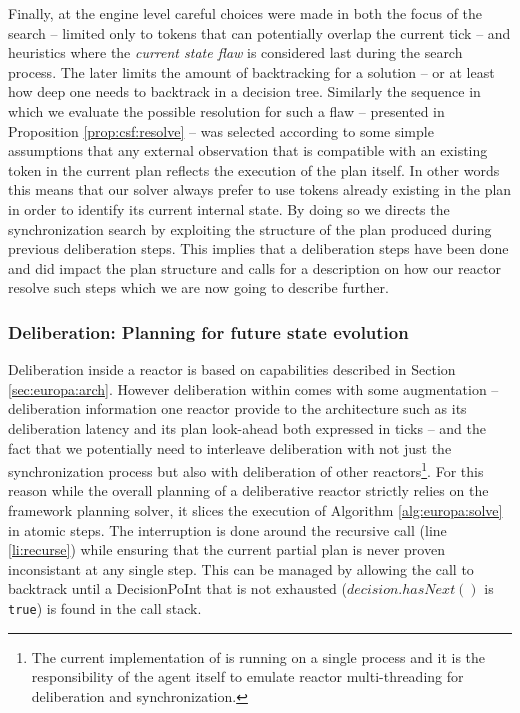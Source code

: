 Finally, at the engine level careful choices were made in 
both the focus of the search -- limited only to tokens that 
can potentially overlap the current tick -- and heuristics where 
the {\em current state flaw} is considered last during the search
process. The later limits the amount of backtracking for a solution 
-- or at least how deep one needs to backtrack in a decision tree. 
Similarly the sequence in which we evaluate the possible resolution 
for such a flaw -- presented in Proposition \ref{prop:csf:resolve} -- 
was selected according to  some simple assumptions that any external 
observation that is compatible with an existing token in the current
plan reflects the execution of the plan itself. In other words this
means that our solver always prefer to use tokens already existing in
the plan in order to identify its current internal state. By doing so
we directs the synchronization search by exploiting the structure of
the plan produced during previous deliberation steps. This implies
that a deliberation steps have been done and did impact the plan
structure and calls for a description on how our \eu reactor resolve
such steps which we are now going to describe further.

\subsubsection{Deliberation: Planning for future state evolution}
\label{sec:arch:plan}

Deliberation inside a reactor is based on \eu capabilities described
in Section \ref{sec:europa:arch}. However deliberation within \rx
comes with some augmentation -- deliberation information one reactor
provide to the architecture such as its deliberation latency and its
plan look-ahead both expressed in ticks -- and the fact that we
potentially need to interleave deliberation with not just the
synchronization process but also with deliberation of other
reactors\footnote{The current implementation of \rx is running on a
  single process and it is the responsibility of the agent itself to
  emulate reactor multi-threading for deliberation and
  synchronization.}. For this reason while the overall planning of a
deliberative reactor strictly relies on the \eu framework planning
solver, it slices the execution of Algorithm \ref{alg:europa:solve} in
atomic steps. The interruption is done around the recursive call (line
\ref{li:recurse}) while ensuring that the current partial plan is
never proven inconsistant at any single step. This can be managed by
allowing the call to backtrack until a \textsf{DecisionPoInt} that is
not exhausted (\ie $decision.hasNext()$ is \texttt{true}) is found in
the call stack.

